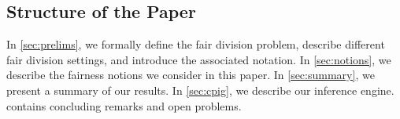 \subsection{Structure of the Paper}

In \cref{sec:prelims}, we formally define the fair division problem,
describe different fair division settings, and introduce the associated notation.
In \cref{sec:notions}, we describe the fairness notions we consider in this paper.
In \cref{sec:summary}, we present a summary of our results.
In \cref{sec:cpig}, we describe our inference engine.
 contains concluding remarks and open problems.

